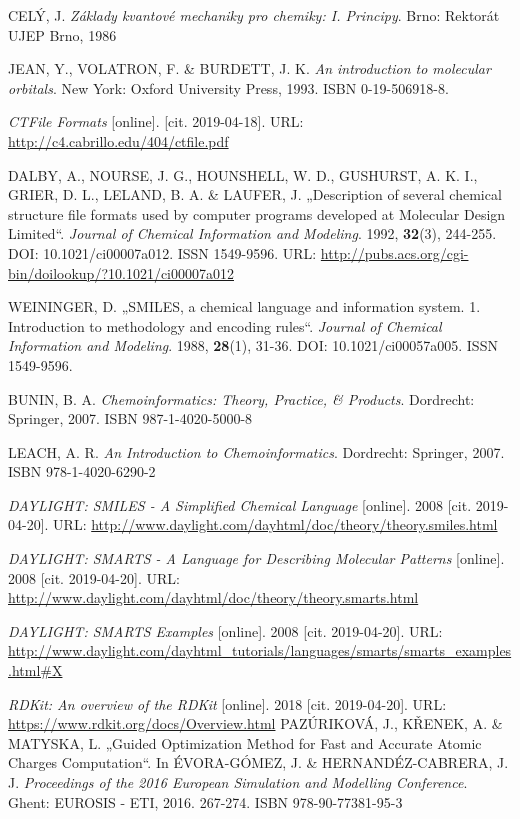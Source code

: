 \begin{thebibliography}{10}
CELÝ, J. \textit{Základy kvantové mechaniky pro chemiky: I. Principy}. Brno: Rektorát UJEP Brno, 1986

JEAN, Y., VOLATRON, F. \& BURDETT, J. K. \textit{An introduction to molecular orbitals}. New York: Oxford University Press, 1993. ISBN 0-19-506918-8.

\textit{CTFile Formats} [online]. [cit. 2019-04-18]. URL: \url{http://c4.cabrillo.edu/404/ctfile.pdf}

DALBY, A., NOURSE, J. G., HOUNSHELL, W. D., GUSHURST, A. K. I., GRIER, D. L., LELAND, B. A. \& LAUFER, J. „Description of several chemical structure file formats used by computer programs developed at Molecular Design Limited“. \textit{Journal of Chemical Information and Modeling}. 1992, \textbf{32}(3), 244-255. DOI: 10.1021/ci00007a012. ISSN 1549-9596. URL: \url{http://pubs.acs.org/cgi-bin/doilookup/?10.1021/ci00007a012}

WEININGER, D. „SMILES, a chemical language and information system. 1. Introduction to methodology and encoding rules“. \textit{Journal of Chemical Information and Modeling}. 1988, \textbf{28}(1), 31-36. DOI: 10.1021/ci00057a005. ISSN 1549-9596.

BUNIN, B. A. \textit{Chemoinformatics: Theory, Practice, \& Products}. Dordrecht: Springer, 2007. ISBN 987-1-4020-5000-8

LEACH, A. R. \textit{An Introduction to Chemoinformatics}. Dordrecht: Springer, 2007. ISBN 978-1-4020-6290-2

\textit{DAYLIGHT: SMILES - A Simplified Chemical Language} [online]. 2008 [cit. 2019-04-20]. URL: \url{ http://www.daylight.com/dayhtml/doc/theory/theory.smiles.html}

\textit{DAYLIGHT: SMARTS - A Language for Describing Molecular Patterns} [online]. 2008 [cit. 2019-04-20]. URL: \url{ http://www.daylight.com/dayhtml/doc/theory/theory.smarts.html}

\textit{DAYLIGHT: SMARTS Examples} [online]. 2008 [cit. 2019-04-20]. URL: \url{ http://www.daylight.com/dayhtml_tutorials/languages/smarts/smarts_examples.html#X}

\textit{RDKit: An overview of the RDKit} [online]. 2018 [cit. 2019-04-20]. URL: \url{ https://www.rdkit.org/docs/Overview.html}
PAZÚRIKOVÁ, J., KŘENEK, A. \& MATYSKA, L. „Guided Optimization Method for Fast and Accurate Atomic Charges Computation“. In ÉVORA-GÓMEZ, J. \& HERNANDÉZ-CABRERA, J. J. \textit{Proceedings of the 2016 European Simulation and Modelling Conference}. Ghent: EUROSIS - ETI, 2016. 267-274. ISBN 978-90-77381-95-3


\end{thebibliography}
